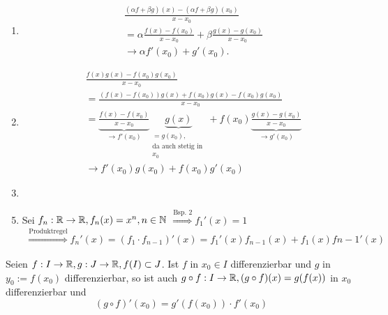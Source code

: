 \documentclass[../ana1.tex]{subfiles}
\begin{document}
\begin{bew}
    \begin{enumerate}
        \item 
        \begin{align*}
            &\frac{ (\alpha f + \beta g)(x) 
            - (\alpha f + \beta g)(x_0) }{ x - x_0 } \\
            &= \alpha \frac{ f(x) - f(x_0) }{x - x_0} + 
            \beta \frac{ g(x) - g(x_0) }{x - x_0}\\
            &\rightarrow \alpha f'(x_0) + g'(x_0).
        \end{align*}
        \item 
        \begin{align*}
            &\frac{ f(x) g(x) - f(x_0)g(x_0) }{ x - x_0 }\\ 
            &= \frac{ (f(x) - f(x_0))g(x) + f(x_0)g(x) 
            - f(x_0)g(x_0) }{ x - x_0 }\\
            &= \underbrace{\frac{f(x) - f(x_0)}{ x - x_0 }}_{
                \rightarrow f'(x_0)} \underbrace{g(x)}_{
                    \substack{=g(x_0),\\ \text{da auch stetig in }\\ x_0}} 
            + f(x_0) \underbrace{\frac{g(x) - g(x_0)}{ x - x_0 }}_{
                \rightarrow g'(x_0)} \\
            &\rightarrow f'(x_0) g(x_0) + f(x_0) g'(x_0)
        \end{align*}
        \item
    \end{enumerate}

\end{bew}
\begin{bsp}
    \begin{enumerate}
        \setcounter{enumi}{4}
        \item Sei \( f_n : \mathbb{R} \rightarrow \mathbb{R}, f_n(x) = x^n, n\in\mathbb{N} \)
        \( \overset{\text{Bsp.\ 2}}{\Rightarrow} f_1'(x) = 1 \)
        \begin{align*}
            \overset{\text{Produktregel}}{\Rightarrow} 
        f_n'(x) = (f_1 \cdot f_{n-1})'(x) = f_1'(x) f_{n-1}(x)
        + f_1(x) f{n-1}'(x)
        \end{align*}
    \end{enumerate}
\end{bsp}
\begin{satz}[Kettenregel]
    Seien \( f: I \rightarrow \mathbb{R}, g : J \rightarrow \mathbb{R}, f(I) \subset J \). 
    Ist \( f \) in \( x_0 \in I \) differenzierbar und \(g\) in 
    \( y_0 := f(x_0) \) differenzierbar, so ist auch 
    \( g \circ f : I \rightarrow \mathbb{R}, (g \circ f)(x) = g(f(x)) \) in \(x_0\) 
    differenzierbar und 
    \[ (g \circ f)'(x_0) = g'(f(x_0)) \cdot f'(x_0) \]
\end{satz}
\end{document}
